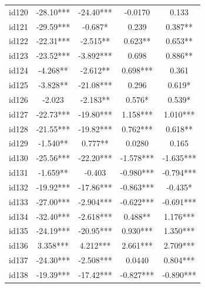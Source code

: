 \documentclass[num-refs]{wiley-article}
\begin{document}
\begin{center}
\begin{longtable}{ccccc}
id120                    & -28.10*** & -24.40***      & -0.0170           & 0.133             \\
id121                    & -29.59*** & -0.687*        & 0.239             & 0.387**           \\
id122                    & -22.31*** & -2.515**       & 0.623**           & 0.653**           \\
id123                    & -23.52*** & -3.892***      & 0.698             & 0.886**           \\
id124                    & -4.268**  & -2.612**       & 0.698***          & 0.361             \\
id125                    & -3.828**  & -21.08***      & 0.296             & 0.619*            \\
id126                    & -2.023    & -2.183**       & 0.576*            & 0.539*            \\
id127                    & -22.73*** & -19.80***      & 1.158***          & 1.010***          \\
id128                    & -21.55*** & -19.82***      & 0.762***          & 0.618**           \\
id129                    & -1.540**  & 0.777**        & 0.0280            & 0.165             \\
id130                    & -25.56*** & -22.20***      & -1.578***         & -1.635***         \\
id131                    & -1.659**  & -0.403         & -0.980***         & -0.794***         \\
id132                    & -19.92*** & -17.86***      & -0.863***         & -0.435*           \\
id133                    & -27.00*** & -2.904***      & -0.622***         & -0.691***         \\
id134                    & -32.40*** & -2.618***      & 0.488**           & 1.176***          \\
id135                    & -24.19*** & -20.95***      & 0.930***          & 1.350***          \\
id136                    & 3.358***  & 4.212***       & 2.661***          & 2.709***          \\
id137                    & -24.30*** & -2.508***      & 0.0440            & 0.804***          \\
id138                    & -19.39*** & -17.42***      & -0.827***         & -0.890***         \\

\end{longtable}
\end{center}
\end{document}
